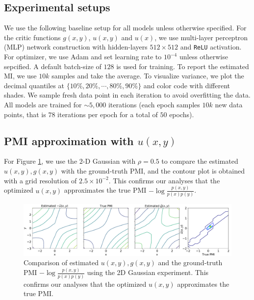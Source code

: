 \documentclass{article}
\theoremstyle{plain}
\theoremstyle{definition}
\theoremstyle{remark}
\begin{document}
		\subsection{Experimental setups}
		
		We use the following baseline setup for all models unless otherwise specified. For the critic functions $g(x,y)$, $u(x,y)$ and $u(x)$, we use multi-layer perceptron (MLP) network construction with hidden-layers $512 \times 512$ and \texttt{ReLU} activation. For optimizer, we use Adam and set learning rate to $10^{-4}$ unless otherwise sepcified. A default batch-size of $128$ is used for training. To report the estimated MI, we use $10k$ samples and take the average. To visualize variance, we plot the decimal quantiles at $\{10\%, 20\%, \cdots, 80\%, 90\%\}$ and color code with different shades. We sample fresh data point in each iteration to avoid overfitting the data. All models are trained for $\sim 5,000$ iterations (each epoch samples $10k$ new data points, that is $78$ iterations per epoch for a total of $50$ epochs). 
		
		
		
		
		
		\subsection{PMI approximation with $u(x,y)$} 
		
		For Figure \ref{fig:contour}, we use the $2$-D Gaussian with $\rho = 0.5$ to compare the estimated $u(x,y), g(x,y)$ with the ground-truth PMI, and the contour plot is obtained with a grid resolution of $2.5 \times 10^{-2}$. This confirms our analyses that the optimized $u(x,y)$ approximates the true PMI $-\log \frac{p(x,y)}{p(x)p(y)}$.  
		
		\begin{figure}
			\centering
			\includegraphics[width=\textwidth]{figures/toy/contour.pdf}
			\caption{Comparison of estimated $u(x,y), g(x,y)$ and the ground-truth PMI $-\log \frac{p(x,y)}{p(x)p(y)}$ using the 2D Gaussian experiment. This confirms our analyses that the optimized $u(x,y)$ approximates the true PMI.}
			\label{fig:contour}
		\end{figure}
		
\end{document}
